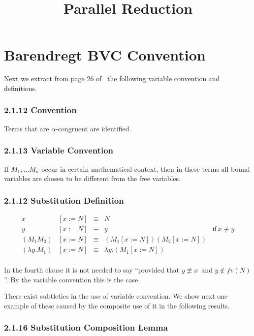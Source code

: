 \documentclass{article}
\title{Parallel Reduction}
\newcommand{\alp}{\ensuremath{\alpha}}
\newcommand{\lam}{\ensuremath{\lambda}}
\begin{document}
\maketitle

\section{Barendregt BVC Convention}

Next we extract from page 26 of~\cite{barendregt81} the following variable convention and definitions.

\subsubsection*{2.1.12 Convention}

Terms that are \alp-congruent are identified.

\subsubsection*{2.1.13 Variable Convention}

If $M_1, \dots M_n$ occur in certain mathematical context, then in these terms all bound variables are chosen to be different from the free variables.


\subsubsection*{2.1.12 Substitution Definition} \label{sec:substitutionBarendregt}

\[
  \begin{array}{llcll}
    x &[x:=N] & \equiv & N &\\
    y &[x:=N] & \equiv & y & \text{if}\ x \not\equiv y\\
    (M_1 M_2) &[x:=N]& \equiv & (M_1 [x:=N]) (M_2 [x:=N]) &\\
    (\lam y . M_1) & [x:=N] & \equiv & \lam y . (M_1 [x:=N])&\\
  \end{array}
\]

\label{notefourth} In the fourth clause it is not needed to say ``provided that $y \not\equiv x$\ and $y \not\in fv(N)$''. By the variable convention this is the case.

There exist subtleties in the use of variable convention. We show next one example of these caused by the composite use of it in the following results.


\subsubsection*{2.1.16 Substitution Composition Lemma}
\end{document}
